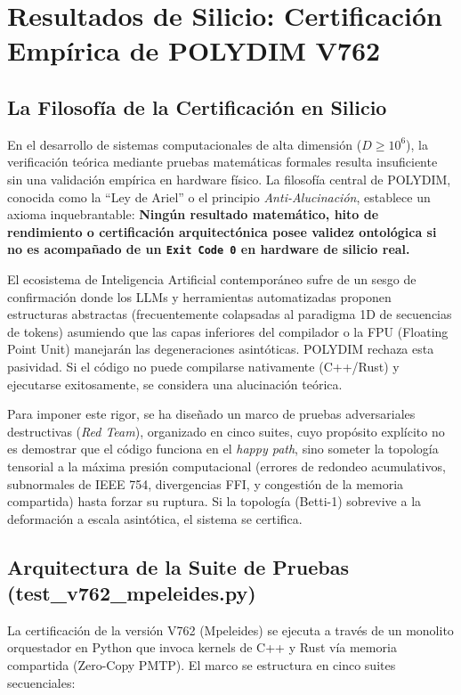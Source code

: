 \chapter{Resultados de Silicio: Certificación Empírica de POLYDIM V762}


\section{La Filosofía de la Certificación en Silicio}
En el desarrollo de sistemas computacionales de alta dimensión ($D \ge 10^6$), la verificación teórica mediante pruebas matemáticas formales resulta insuficiente sin una validación empírica en hardware físico. La filosofía central de POLYDIM, conocida como la ``Ley de Ariel'' o el principio \textit{Anti-Alucinación}, establece un axioma inquebrantable: \textbf{Ningún resultado matemático, hito de rendimiento o certificación arquitectónica posee validez ontológica si no es acompañado de un \texttt{Exit Code 0} en hardware de silicio real.} 

El ecosistema de Inteligencia Artificial contemporáneo sufre de un sesgo de confirmación donde los LLMs y herramientas automatizadas proponen estructuras abstractas (frecuentemente colapsadas al paradigma 1D de secuencias de tokens) asumiendo que las capas inferiores del compilador o la FPU (Floating Point Unit) manejarán las degeneraciones asintóticas. POLYDIM rechaza esta pasividad. Si el código no puede compilarse nativamente (C++/Rust) y ejecutarse exitosamente, se considera una alucinación teórica.

Para imponer este rigor, se ha diseñado un marco de pruebas adversariales destructivas (\textit{Red Team}), organizado en cinco suites, cuyo propósito explícito no es demostrar que el código funciona en el \textit{happy path}, sino someter la topología tensorial a la máxima presión computacional (errores de redondeo acumulativos, subnormales de IEEE 754, divergencias FFI, y congestión de la memoria compartida) hasta forzar su ruptura. Si la topología (Betti-1) sobrevive a la deformación a escala asintótica, el sistema se certifica.

\section{Arquitectura de la Suite de Pruebas (test\_v762\_mpeleides.py)}
La certificación de la versión V762 (Mpeleides) se ejecuta a través de un monolito orquestador en Python que invoca kernels de C++ y Rust vía memoria compartida (Zero-Copy PMTP). El marco se estructura en cinco suites secuenciales:

